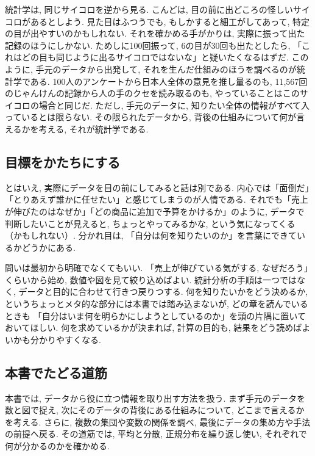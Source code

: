     統計学は, 同じサイコロを逆から見る.
    こんどは, 目の前に出どころの怪しいサイコロがあるとしよう.
    見た目はふつうでも, もしかすると細工がしてあって, 特定の目が出やすいのかもしれない.
    それを確かめる手がかりは, 実際に振って出た記録のほうにしかない.
    ためしに100回振って, 6の目が30回も出たとしたら, 「これはどの目も同じように出るサイコロではないな」と疑いたくなるはずだ.
    このように, 手元のデータから出発して, それを生んだ仕組みのほうを調べるのが統計学である.
    100人のアンケートから日本人全体の意見を推し量るのも, 11{,}567回のじゃんけんの記録から人の手のクセを読み取るのも, やっていることはこのサイコロの場合と同じだ.
    ただし, 手元のデータに, 知りたい全体の情報がすべて入っているとは限らない.
    その限られたデータから, 背後の仕組みについて何が言えるかを考える, それが統計学である.

  \subsection{目標をかたちにする}

    とはいえ, 実際にデータを目の前にしてみると話は別である. 
    内心では「面倒だ」「とりあえず誰かに任せたい」と感じてしまうのが人情である. 
    それでも「売上が伸びたのはなぜか」「どの商品に追加で予算をかけるか」のように, データで判断したいことが見えると,
    ちょっとやってみるかな, という気になってくる（かもしれない）. 
    分かれ目は, 「自分は何を知りたいのか」を言葉にできているかどうかにある.

    問いは最初から明確でなくてもいい. 「売上が伸びている気がする, なぜだろう」くらいから始め, 数値や図を見て絞り込めばよい.
    統計分析の手順は一つではなく, データと目的に合わせて行きつ戻りつする.
    何を知りたいかをどう決めるか, というちょっとメタ的な部分には本書では踏み込まないが,
    どの章を読んでいるときも 「自分はいま何を明らかにしようとしているのか」を頭の片隅に置いておいてほしい. 
    何を求めているかが決まれば, 計算の目的も, 結果をどう読めばよいかも分かりやすくなる.

  \subsection{本書でたどる道筋}

    本書では, データから役に立つ情報を取り出す方法を扱う.
    まず手元のデータを数と図で捉え, 次にそのデータの背後にある仕組みについて, どこまで言えるかを考える.
    さらに, 複数の集団や変数の関係を調べ, 最後にデータの集め方や手法の前提へ戻る.
    その道筋では, 平均と分散, 正規分布を繰り返し使い, それぞれで何が分かるのかを確かめる.


